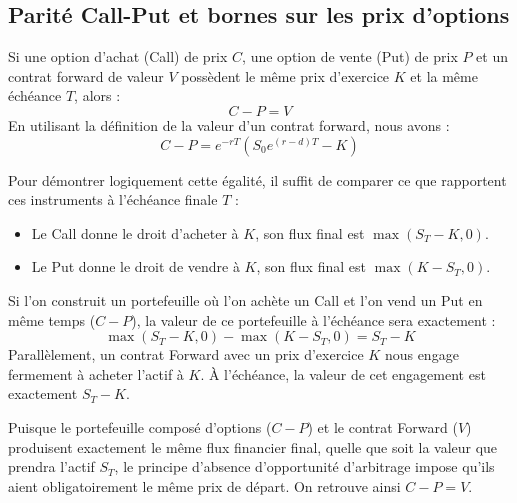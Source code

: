 \subsection{Parité Call-Put et bornes sur les prix d'options}

\begin{theorembox}
Si une option d'achat (Call) de prix $C$, une option de vente (Put) de prix $P$ et un contrat forward de valeur $V$ possèdent le même prix d'exercice $K$ et la même échéance $T$, alors :
\begin{equation}
    \label{eq:fsec2-parite_call_put}
    C - P = V
\end{equation}
En utilisant la définition de la valeur d'un contrat forward, nous avons :
\begin{equation}
    \label{eq:fsec2-parite_dev}
    C - P = e^{-rT} (S_0 e^{(r-d)T} - K)
\end{equation}
\end{theorembox}

\begin{proofbox}
Pour démontrer logiquement cette égalité, il suffit de comparer ce que rapportent ces instruments à l'échéance finale $T$ :
\begin{itemize}[label=$\rightarrow$]
    \item Le Call donne le droit d'acheter à $K$, son flux final est $\max(S_T - K, 0)$.
    \item Le Put donne le droit de vendre à $K$, son flux final est $\max(K - S_T, 0)$.
\end{itemize}
Si l'on construit un portefeuille où l'on achète un Call et l'on vend un Put en même temps ($C - P$), la valeur de ce portefeuille à l'échéance sera exactement :
\begin{equation}
    \label{eq:fsec2-parite_payoff}
    \max(S_T - K, 0) - \max(K - S_T, 0) = S_T - K
\end{equation}
Parallèlement, un contrat Forward avec un prix d'exercice $K$ nous engage fermement à acheter l'actif à $K$. À l'échéance, la valeur de cet engagement est exactement $S_T - K$.

Puisque le portefeuille composé d'options ($C - P$) et le contrat Forward ($V$) produisent exactement le même flux financier final, quelle que soit la valeur que prendra l'actif $S_T$, le principe d'absence d'opportunité d'arbitrage impose qu'ils aient obligatoirement le même prix de départ. On retrouve ainsi $C - P = V$.
\end{proofbox}

